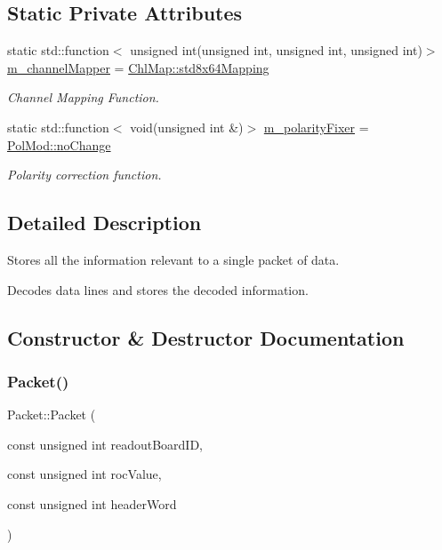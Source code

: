 \subsection*{Static Private Attributes}
\begin{DoxyCompactItemize}
\item 
static std\+::function$<$ unsigned int(unsigned int, unsigned int, unsigned int)$>$ \hyperlink{class_packet_a27f9a040a63e06e20a2097133a588997}{m\+\_\+channel\+Mapper} = \hyperlink{namespace_chl_map_a1c25ae4d560fda9abe7fb0684c6ceae7}{Chl\+Map\+::std8x64\+Mapping}
\begin{DoxyCompactList}\small\item\em Channel Mapping Function. \end{DoxyCompactList}\item 
static std\+::function$<$ void(unsigned int \&)$>$ \hyperlink{class_packet_a89f279819afdfb930b201009d821e7f9}{m\+\_\+polarity\+Fixer} = \hyperlink{namespace_pol_mod_ab917c96757340e5d8901808f819ddf4c}{Pol\+Mod\+::no\+Change}
\begin{DoxyCompactList}\small\item\em Polarity correction function. \end{DoxyCompactList}\end{DoxyCompactItemize}


\subsection{Detailed Description}
Stores all the information relevant to a single packet of data. 

Decodes data lines and stores the decoded information. 

\subsection{Constructor \& Destructor Documentation}
\mbox{\label{class_packet_ac78ad72c2d0333e03dfdd5460fd6e816}} 
\subsubsection{\texorpdfstring{Packet()}{Packet()}}
{\footnotesize\ttfamily Packet\+::\+Packet (\begin{DoxyParamCaption}\item[{const unsigned int}]{readout\+Board\+ID,  }\item[{const unsigned int}]{roc\+Value,  }\item[{const unsigned int}]{header\+Word }\end{DoxyParamCaption})}



